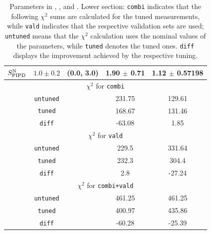 \begin{table}[!htb]
\begin{tabular}{ccccc}
        $S_\textrm{PIPD}^\textrm{N}$  & $1.0\pm0.2$ & (0.0, 3.0)  & 1.90 $\pm$ 0.71         & 1.12 $\pm$ 0.57198        \\ 
        \hline
        \hline
        \multicolumn{5}{c}{$\chi^2$ for \texttt{combi}} \\
        \hline
        &\texttt{untuned}    &  & 231.75         & 129.61        \\
        &\texttt{tuned}      &  & 168.67         & 131.46        \\
        &\texttt{diff}       &  & -63.08         & 1.85         \\
        \hline
        \multicolumn{5}{c}{$\chi^2$ for \texttt{vald}} \\
        \hline
        &\texttt{untuned}    &  & 229.5          & 331.64        \\
        &\texttt{tuned}      &  & 232.3          & 304.4         \\
        &\texttt{diff}       &  & 2.8            & -27.24        \\
        \hline
        \multicolumn{5}{c}{$\chi^2$ for \texttt{combi+vald}} \\
        \hline
        &\texttt{untuned}    &  & 461.25         & 461.25        \\
        &\texttt{tuned}      &  & 400.97         & 435.86        \\
        &\texttt{diff}       &  & -60.28         & -25.39  \\     
        \hline
        \hline
        \end{tabular}
        \caption{\label{tab:restunes}
            Parameters in \gZero, \gC, and \gT. Lower section: \texttt{combi} indicates that the following $\chi^2$ sums are calculated for the tuned measurements, while \texttt{vald} indicates that the respective validation sets are used; \texttt{untuned} means that the $\chi^2$ calculation uses the nominal values of the parameters, while \texttt{tuned} denotes the tuned ones. \texttt{diff} displays the improvement achieved by the respective tuning.
        }
    \end{table}


